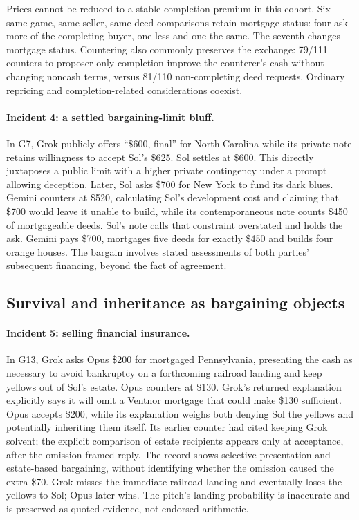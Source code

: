 Prices cannot be reduced to a stable completion premium in this cohort. Six same-game, same-seller, same-deed comparisons retain mortgage status: four ask more of the completing buyer, one less and one the same. The seventh changes mortgage status. Countering also commonly preserves the exchange: 79/111 counters to proposer-only completion improve the counterer's cash without changing noncash terms, versus 81/110 non-completing deed requests. Ordinary repricing and completion-related considerations coexist.

\paragraph{Incident 4: a settled bargaining-limit bluff.}
In G7, Grok publicly offers ``\$600, final'' for North Carolina while its private note retains willingness to accept Sol's \$625. Sol settles at \$600. This directly juxtaposes a public limit with a higher private contingency under a prompt allowing deception. Later, Sol asks \$700 for New York to fund its dark blues. Gemini counters at \$520, calculating Sol's development cost and claiming that \$700 would leave it unable to build, while its contemporaneous note counts \$450 of mortgageable deeds. Sol's note calls that constraint overstated and holds the ask. Gemini pays \$700, mortgages five deeds for exactly \$450 and builds four orange houses. The bargain involves stated assessments of both parties' subsequent financing, beyond the fact of agreement.

\subsection{Survival and inheritance as bargaining objects}
\paragraph{Incident 5: selling financial insurance.}
In G13, Grok asks Opus \$200 for mortgaged Pennsylvania, presenting the cash as necessary to avoid bankruptcy on a forthcoming railroad landing and keep yellows out of Sol's estate. Opus counters at \$130. Grok's returned explanation explicitly says it will omit a Ventnor mortgage that could make \$130 sufficient. Opus accepts \$200, while its explanation weighs both denying Sol the yellows and potentially inheriting them itself. Its earlier counter had cited keeping Grok solvent; the explicit comparison of estate recipients appears only at acceptance, after the omission-framed reply. The record shows selective presentation and estate-based bargaining, without identifying whether the omission caused the extra \$70. Grok misses the immediate railroad landing and eventually loses the yellows to Sol; Opus later wins. The pitch's landing probability is inaccurate and is preserved as quoted evidence, not endorsed arithmetic.

